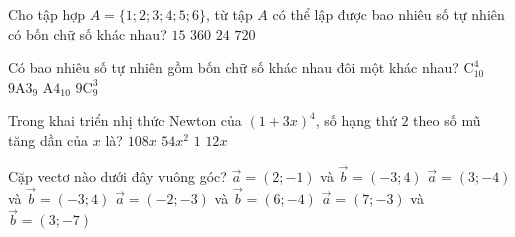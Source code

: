 \begin{ex}%
	Cho tập hợp $A=\{1;2;3;4;5;6\}$, từ tập $A$ có thể lập được bao nhiêu số tự nhiên có bốn chữ số khác nhau?
	\choice
	{ $15$}
	{\True $360$}
	{ $24$}
	{ $720$}
\end{ex}
\begin{ex}%
	Có bao nhiêu số tự nhiên gồm bốn chữ số khác nhau đôi một khác nhau?
	\choice
	{$\mathrm C^4_{10}$}
	{\True $9 \mathrm{A}3_{9}$}
	{$ \mathrm{A}4_{10}$}
	{$9\mathrm C^3_{9}$}
\end{ex}
\begin{ex}%
	Trong khai triển nhị thức Newton của $\left( 1+3x\right) ^4$, số hạng thứ $2$ theo số mũ tăng dần của $x$ là?
	\choice
	{$108x$}
	{$54x^2$}
	{$1$}
	{\True $12x$}
\end{ex}
\begin{ex}%
	Cặp vectơ nào dưới đây vuông góc?
	\choice
	{$\overrightarrow{a}=\left(2;-1\right)$ và $\overrightarrow{b}=\left(-3;4 \right)$}
	{$\overrightarrow{a}=\left(3;-4\right)$ và $\overrightarrow{b}=\left(-3;4 \right)$}
	{\True $\overrightarrow{a}=\left(-2;-3\right)$ và $\overrightarrow{b}=\left(6;-4 \right)$}
	{$\overrightarrow{a}=\left(7;-3 \right)$ và $\overrightarrow{b}=\left(3;-7\right)$}
\end{ex}
